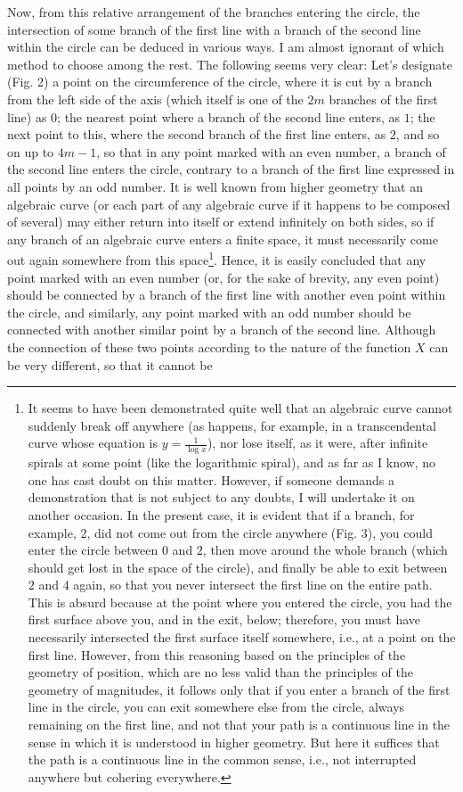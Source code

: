 \documentclass[12pt]{memoir}
\theoremstyle{plain}
\theoremstyle{remark}
\begin{document}
Now, from this relative arrangement of the branches entering the circle, the intersection of some branch of the first line with a branch of the second line within the circle can be deduced in various ways. I am almost ignorant of which method to choose among the rest. The following seems very clear: Let's designate (Fig. 2) a point on the circumference of the circle, where it is cut by a branch from the left side of the axis (which itself is one of the \(2m\) branches of the first line) as \(0\); the nearest point where a branch of the second line enters, as \(1\); the next point to this, where the second branch of the first line enters, as \(2\), and so on up to \(4m-1\), so that in any point marked with an even number, a branch of the second line enters the circle, contrary to a branch of the first line expressed in all points by an odd number. It is well known from higher geometry that an algebraic curve (or each part of any algebraic curve if it happens to be composed of several) may either return into itself or extend infinitely on both sides, so if any branch of an algebraic curve enters a finite space, it must necessarily come out again somewhere from this space\footnote{It seems to have been demonstrated quite well that an algebraic curve cannot suddenly break off anywhere (as happens, for example, in a transcendental curve whose equation is \( y = \frac{1}{\log x} \)), nor lose itself, as it were, after infinite spirals at some point (like the logarithmic spiral), and as far as I know, no one has cast doubt on this matter. However, if someone demands a demonstration that is not subject to any doubts, I will undertake it on another occasion. In the present case, it is evident that if a branch, for example, 2, did not come out from the circle anywhere (Fig. 3), you could enter the circle between \(0\) and \(2\), then move around the whole branch (which should get lost in the space of the circle), and finally be able to exit between \(2\) and \(4\) again, so that you never intersect the first line on the entire path. This is absurd because at the point where you entered the circle, you had the first surface above you, and in the exit, below; therefore, you must have necessarily intersected the first surface itself somewhere, i.e., at a point on the first line. However, from this reasoning based on the principles of the geometry of position, which are no less valid than the principles of the geometry of magnitudes, it follows only that if you enter a branch of the first line in the circle, you can exit somewhere else from the circle, always remaining on the first line, and not that your path is a continuous line in the sense in which it is understood in higher geometry. But here it suffices that the path is a continuous line in the common sense, i.e., not interrupted anywhere but cohering everywhere.}. Hence, it is easily concluded that any point marked with an even number (or, for the sake of brevity, any even point) should be connected by a branch of the first line with another even point within the circle, and similarly, any point marked with an odd number should be connected with another similar point by a branch of the second line. Although the connection of these two points according to the nature of the function \(X\) can be very different, so that it cannot be 
\end{document}
